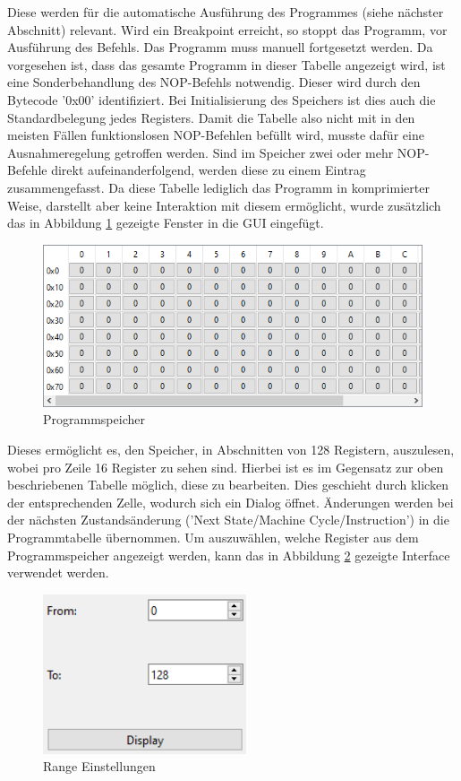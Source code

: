 \documentclass[12pt]{article}
\newcommand{\imgSpaceBefore}{\vspace{10pt}}
\begin{document}
\noindent
Diese werden für die automatische Ausführung des Programmes (siehe nächster Abschnitt) relevant. Wird ein Breakpoint erreicht, so stoppt das Programm, vor Ausführung des Befehls. Das Programm muss manuell fortgesetzt werden. Da vorgesehen ist, dass das gesamte Programm in dieser Tabelle angezeigt wird, ist eine Sonderbehandlung des NOP-Befehls notwendig. Dieser wird durch den Bytecode '0x00' identifiziert. Bei Initialisierung des Speichers ist dies auch die Standardbelegung jedes Registers. Damit die Tabelle also nicht mit in den meisten Fällen funktionslosen NOP-Befehlen befüllt wird, musste dafür eine Ausnahmeregelung getroffen werden. Sind im Speicher zwei oder mehr NOP-Befehle direkt aufeinanderfolgend, werden diese zu einem Eintrag zusammengefasst. Da diese Tabelle lediglich das Programm in komprimierter Weise, darstellt aber keine Interaktion mit diesem ermöglicht, wurde zusätzlich das in Abbildung \ref{fig:ProgSpeicher} gezeigte Fenster in die GUI eingefügt.\imgSpaceBefore

\begin{figure}[H]
\centering
\includegraphics[width=12cm]{bilder/ProgramMemory}
\caption{Programmspeicher}
\label{fig:ProgSpeicher}
\end{figure}

\noindent
Dieses ermöglicht es, den Speicher, in Abschnitten von 128 Registern, auszulesen, wobei pro Zeile 16 Register zu sehen sind. Hierbei ist es im Gegensatz zur oben beschriebenen Tabelle möglich, diese zu bearbeiten. Dies geschieht durch klicken der entsprechenden Zelle, wodurch sich ein Dialog öffnet. Änderungen werden bei der nächsten Zustandsänderung ('Next State/Machine Cycle/Instruction') in die Programmtabelle übernommen. Um auszuwählen, welche Register aus dem Programmspeicher angezeigt werden, kann das in Abbildung \ref{fig:Range} gezeigte Interface verwendet werden.\imgSpaceBefore

\begin{figure}[h]
\centering
\includegraphics[width=6cm]{bilder/Range}
\caption{Range Einstellungen}
\label{fig:Range}
\end{figure}
\end{document}
